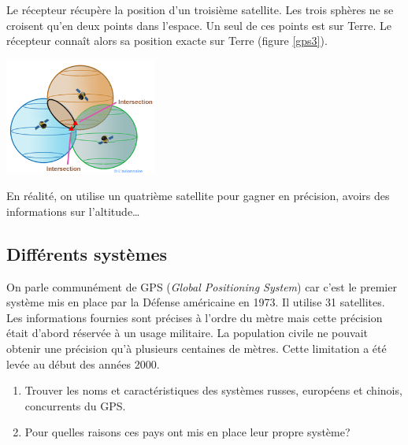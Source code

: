 \documentclass[a4paper,11pt]{article}
\begin{document}
Le récepteur récupère la position d'un troisième satellite. Les trois sphères ne se croisent qu'en deux points dans l'espace. Un seul de ces points est sur Terre. Le récepteur connaît alors sa position exacte sur Terre (figure \ref{gps3}).
\begin{center}
    \centering
    \includegraphics[width=5cm]{ressources/gps3.png}

    \label{gps3}
\end{center}
\begin{aretenir}[Remarque]
En réalité, on utilise un quatrième satellite pour gagner en précision, avoirs des informations sur l'altitude\dots
\end{aretenir}
\subsection{Différents systèmes}
On parle communément de GPS (\emph{Global Positioning System}) car c'est le premier système mis en place par la Défense américaine en 1973. Il utilise 31 satellites. Les informations fournies sont précises à l'ordre du mètre mais cette précision était d'abord réservée à un usage militaire. La population civile ne pouvait obtenir une précision qu'à plusieurs centaines de mètres. Cette limitation a été levée au début des années 2000.
\begin{activite}
\begin{enumerate}
    \item Trouver les noms et caractéristiques des systèmes russes, européens et chinois, concurrents du GPS.
    \item Pour quelles raisons ces pays ont mis en place leur propre système?
\end{enumerate}
\end{activite}
\end{document}
